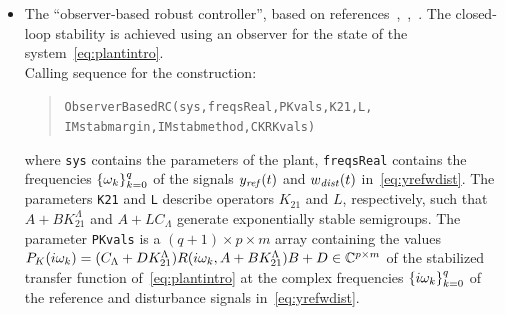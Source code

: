 \documentclass[11pt, a4paper]{amsart}
\newcommand{\CL}{C_\Lambda}
\theoremstyle{definition}
\numberwithin{equation}{section}
\newcommand{\yref}{y_{\mbox{\scriptsize\textit{ref}}}}
\newcommand{\wdist}{w_{\mbox{\scriptsize\textit{dist}}}}
\begin{document}
\begin{itemize}
  \item The ``observer-based robust controller'', based on references~,~,~. The closed-loop stability is achieved using an observer for the state of the system~\eqref{eq:plantintro}.\\[1ex]
      Calling sequence for the construction:\\[-1ex]
     \begin{quotation}
       \texttt{ObserverBasedRC(sys,freqsReal,PKvals,K21,L,\\ 
	 \phantom{a}\hspace{2.7cm} IMstabmargin,IMstabmethod,CKRKvals)}
     \end{quotation}
     \medskip
     where \texttt{sys} contains the parameters of the plant, \texttt{freqsReal} contains the frequencies $\{\omega_k\}_{k=0}^q$ of the signals $\yref(t)$ and $\wdist(t)$ in~\eqref{eq:yrefwdist}.
     The parameters \texttt{K21} and \texttt{L} describe operators $K_{21}$ and $L$, respectively, such that $A+BK_{21}^\Lambda$ and $A+L\CL$ generate exponentially stable semigroups. 
The parameter \texttt{PKvals} is a $(q+1)\times p\times m$ array containing the values $P_K(i\gw_k)=(\CL +DK_{21}^\Lambda)R(i\gw_k,A+BK_{21}^\Lambda)B+D\in \C^{p\times m}$ of the stabilized transfer function of~\eqref{eq:plantintro} at the complex frequencies $\{i\omega_k\}_{k=0}^q$ of the reference and disturbance signals in~\eqref{eq:yrefwdist}.


\end{itemize}
\end{document}
